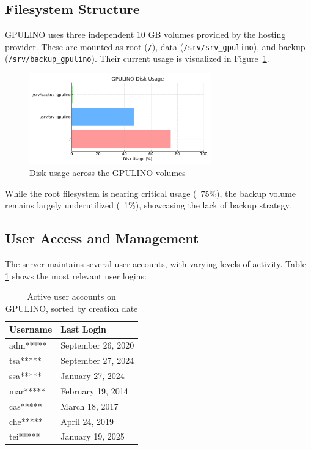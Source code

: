 \subsection*{Filesystem Structure}

GPULINO uses three independent 10 GB volumes provided by the hosting provider. These are mounted as root (\verb|/|), data (\verb|/srv/srv_gpulino|), and backup (\verb|/srv/backup_gpulino|). Their current usage is visualized in Figure~\ref{fig:gpulino_disk_usage}.

\begin{figure}[H]
  \centering
  \includegraphics[width=0.7\textwidth]{figuras/gpulino_disk_usage.pdf}
  \caption{Disk usage across the GPULINO volumes}
  \label{fig:gpulino_disk_usage}
\end{figure}

While the root filesystem is nearing critical usage (~75\%), the backup volume remains largely underutilized (~1\%), showcasing the lack of backup strategy.

\subsection*{User Access and Management}

The server maintains several user accounts, with varying levels of activity. Table \ref{tab:gpulino_users} shows the most relevant user logins:

\begin{table}[H]
  \centering
  \caption{Active user accounts on GPULINO, sorted by creation date}
  \label{tab:gpulino_users}
  \begin{tabular}{ll}
    \rowcolor{udcpink!25}
    \textbf{Username} & \textbf{Last Login} \\
    \hline
    adm***** & September 26, 2020 \\
    tsa***** & September 27, 2024 \\
    ssa***** & January 27, 2024 \\
    mar***** & February 19, 2014 \\
    cas***** & March 18, 2017 \\
    che***** & April 24, 2019 \\
    tei***** & January 19, 2025 \\
  \end{tabular}
\end{table}

